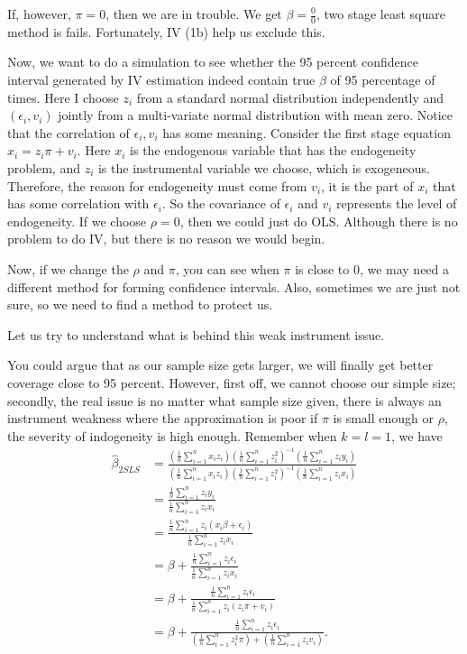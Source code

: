 \documentclass[11pt,a4paper]{amsart}
\theoremstyle{plain}
\theoremstyle{definition}
\begin{document}
		If, however, $\pi = 0$, then we are in trouble. We get $\beta = \frac{0}{0}$, two stage least square method is fails. Fortunately, IV (1b) help us exclude this.\par 
		Now, we want to do a simulation to see whether the 95 percent confidence interval generated by IV estimation indeed contain true $\beta$ of 95 percentage of times. Here I choose $z_{i}$ from a standard normal distribution independently and $(\epsilon_{i},v_{i})$ jointly from a multi-variate normal distribution with mean zero. Notice that the correlation of $\epsilon_{i}, v_{i}$ has some meaning. Consider the first stage equation $x_{i} = z_{i}\pi + v_{i}$. Here $x_{i}$ is the endogenous variable that has the endogeneity problem, and $z_{i}$ is the instrumental variable we choose, which is exogeneous. Therefore, the reason for endogeneity must come from $v_{i}$, it is the part of $x_{i}$ that has some correlation with $\epsilon_{i}$. So the covariance of $\epsilon_{i}$ and $v_{i}$ represents the level of endogeneity. If we choose $\rho = 0$, then we could just do OLS. Although there is no problem to do IV, but there is no reason we would begin. \par 
		Now, if we change the $\rho$ and $\pi$, you can see when $\pi$ is close to $0$, we may need a different method for forming confidence intervals. Also, sometimes we are just not sure, so we need to find a method to protect us.\par 
		Let us try to understand what is behind this weak instrument issue.\par 
		You could argue that as our sample size gets larger, we will finally get better coverage close to 95 percent. However, first off, we cannot choose our simple size; secondly, the real issue is no matter what sample size given, there is always an instrument weakness where the approximation is poor if $\pi$ is small enough or $\rho$, the severity of indogeneity is high enough. Remember when $k = l = 1$, we have 
		\[	\begin{aligned}
		\hat{\beta}_{2SLS} &= \frac{(\frac{1}{n}\sum_{i=1}^{n}x_{i}z_{i})(\frac{1}{n}\sum_{i=1}^{n}z_{i}^{2})^{-1}(\frac{1}{n}\sum_{i=1}^{n}z_{i}y_{i})}{(\frac{1}{n}\sum_{i=1}^{n}x_{i}z_{i})(\frac{1}{n}\sum_{i=1}^{n}z_{i}^{2})^{-1}(\frac{1}{n}\sum_{i=1}^{n}z_{i}x_{i})}\\
		&= \frac{\frac{1}{n}\sum_{i=1}^{n}z_{i}y_{i}}{\frac{1}{n}\sum_{i=1}^{n}z_{i}x_{i}}\\
		&= \frac{\frac{1}{n}\sum_{i=1}^{n}z_{i}(x_{i}\beta + \epsilon_{i})}{\frac{1}{n}\sum_{i=1}^{n}z_{i}x_{i}}\\
		&= \beta + \frac{\frac{1}{n}\sum_{i=1}^{n}z_{i}\epsilon_{i}}{\frac{1}{n}\sum_{i=1}^{n}z_{i}x_{i}} \\
		&= \beta + \frac{\frac{1}{n}\sum_{i=1}^{n}z_{i}\epsilon_{i}}{\frac{1}{n}\sum_{i=1}^{n}z_{i}(z_{i}\pi + v_{i})} \\
		&= \beta + \frac{\frac{1}{n}\sum_{i=1}^{n}z_{i}\epsilon_{i}}{(\frac{1}{n}\sum_{i=1}^{n}z_{i}^{2}\pi) + (\frac{1}{n}\sum_{i=1}^{n}z_{i}v_{i})}.
		\end{aligned}	\]
\end{document}
